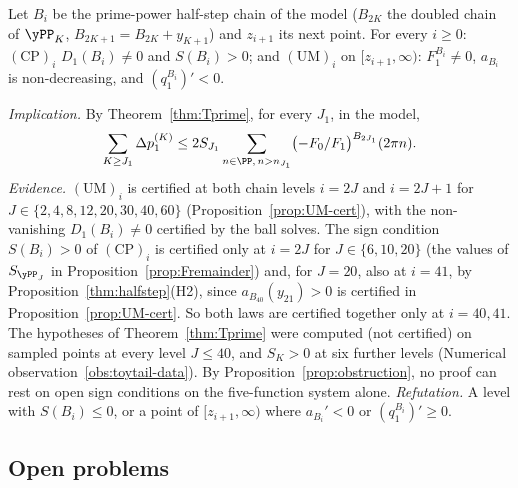 \begin{conjecture}\label{conj:UM}
Let $B_i$ be the prime-power half-step chain of the model ($B_{2K}$ the doubled chain of $\yPP_K$,
$B_{2K+1}=B_{2K}+y_{K+1}$) and $z_{i+1}$ its next point. For every $i\ge0$: $(\mathrm{CP})_i$ $D_1(B_i)\neq0$ and
$S(B_i)>0$; and $(\mathrm{UM})_i$ on $[z_{i+1},\infty)$: $F_1^{B_i}\neq0$, $a_{B_i}$ is non-decreasing, and
$(q_1^{B_i})'<0$.
\end{conjecture}

\emph{Implication.} By Theorem~\ref{thm:Tprime}, for every $J_1$, in the model,
\[
  \sum_{K\ge J_1}\Delta p_1^{(K)}\le2S_{J_1}\sum_{n\in\PP,\,n>n_{J_1}}\bigl(-F_0/F_1\bigr)^{B_{2J_1}}(2\pi n).
\]
\emph{Evidence.} $(\mathrm{UM})_i$ is certified at both chain levels $i=2J$ and $i=2J+1$ for
$J\in\{2,4,8,12,20,30,40,60\}$ (Proposition~\ref{prop:UM-cert}), with the non-vanishing $D_1(B_i)\ne0$ certified by the ball
solves. The sign condition $S(B_i)>0$ of $(\mathrm{CP})_i$ is certified only at $i=2J$ for $J\in\{6,10,20\}$ (the values of
$S_{\yPP_J}$ in Proposition~\ref{prop:Fremainder}) and, for $J=20$, also at $i=41$, by
Proposition~\ref{thm:halfstep}\textup{(H2)}, since $a_{B_{40}}(y_{21})>0$ is certified in Proposition~\ref{prop:UM-cert}. So both
laws are certified together only at $i=40,41$. The hypotheses of Theorem~\ref{thm:Tprime} were computed (not certified) on
sampled points at every level $J\le40$, and $S_K>0$ at six further levels (Numerical observation~\ref{obs:toytail-data}). By Proposition~\ref{prop:obstruction}, no proof can rest on open sign
conditions on the five-function system alone. \emph{Refutation.} A level with $S(B_i)\le0$, or a point of
$[z_{i+1},\infty)$ where $a_{B_i}'<0$ or $(q_1^{B_i})'\ge0$.

\subsection{Open problems}\label{ssec:open}

